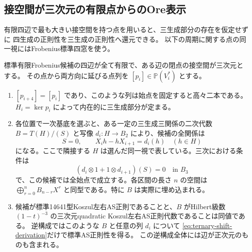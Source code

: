 \subsection{接空間が三次元の有限点からのOre表示}
\label{sec:maximal-tangent-ore}
有限四辺で最も大きい接空間を持つ点を用いると、三生成部分の存在を仮定せずに
四生成の正則性を三生成の正則性へ還元できる。
以下の周期に関する点の同一視にはFrobenius標準四窓を使う。

\begin{theorem}\label{thm:maximal-tangent-ore}
標準有限Frobenius候補の四辺が全て有限で、ある辺の閉点の接空間が三次元とする。
その点から両方向に延びる点列を $[p_i]\in\mathbb P(V_i^*)$ とする。
\begin{enumerate}
\item $[p_{i+4}]=[p_i]$ であり、このような列は始点を固定すると高々二本である。
$H_i=\ker p_i$ によって内在的に三生成部分が定まる。
\item 各位置で一次基底を選ぶと、ある一定の三生成三関係の二次代数
$B=T(H)/(S)$ と写像 $d_i:H\to B_2$ により、候補の全関係は
\[
         S=0,\qquad X_i h-h X_{i+1}=d_i(h)\quad(h\in H)
\]
になる。ここで隣接する $H$ は選んだ同一視で表している。三次における条件は
\begin{equation}\label{eq:ternary-shift-derivation}
       (d_i\otimes 1+1\otimes d_{i+1})(S)=0\quad\text{in } B_3
\end{equation}
で、この候補では全始点で成立する。各区間の長さ $n$ の空間は
$\bigoplus_{r=0}^n B_{n-r}X^r$ と同型である。特に $B$ は実際に埋め込まれる。
\item 候補が標準14641型Koszul左右AS正則であることと、$B$ がHilbert級数
$(1-t)^{-3}$ の三次元quadratic Koszul左右AS正則代数であることは同値である。
逆構成ではこのような $B$ と任意の列 $d_i$ について
\eqref{eq:ternary-shift-derivation}だけで標準AS正則性を得る。
この逆構成全体には辺が正次元のものも含まれる。
\end{enumerate}
\end{theorem}
